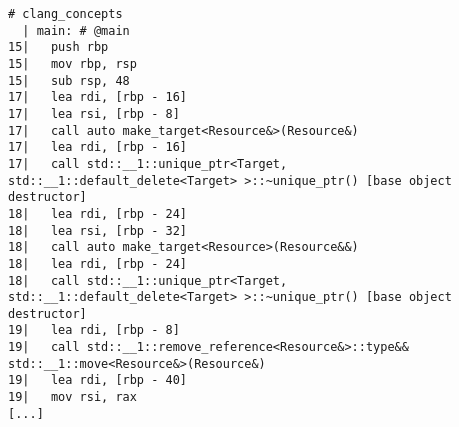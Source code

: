 \begin{lstlisting}[language={},numbers=none,title=\href{https://godbolt.org/z/421VvS}{\texttt{godbolt.org/z/421VvS}}]
# clang_concepts 
  | main: # @main
15|   push rbp
15|   mov rbp, rsp
15|   sub rsp, 48
17|   lea rdi, [rbp - 16]
17|   lea rsi, [rbp - 8]
17|   call auto make_target<Resource&>(Resource&)
17|   lea rdi, [rbp - 16]
17|   call std::__1::unique_ptr<Target, std::__1::default_delete<Target> >::~unique_ptr() [base object destructor]
18|   lea rdi, [rbp - 24]
18|   lea rsi, [rbp - 32]
18|   call auto make_target<Resource>(Resource&&)
18|   lea rdi, [rbp - 24]
18|   call std::__1::unique_ptr<Target, std::__1::default_delete<Target> >::~unique_ptr() [base object destructor]
19|   lea rdi, [rbp - 8]
19|   call std::__1::remove_reference<Resource&>::type&& std::__1::move<Resource&>(Resource&)
19|   lea rdi, [rbp - 40]
19|   mov rsi, rax
[...]
\end{lstlisting}
